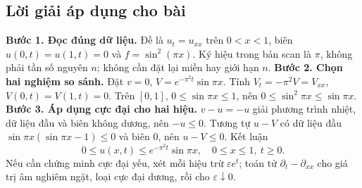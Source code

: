 \documentclass[10pt,a4paper]{article}
\begin{document}
\subsection*{Lời giải áp dụng cho bài}
\textbf{Bước 1. Đọc đúng dữ liệu.} Đề là $u_t=u_{xx}$ trên $0<x<1$, biên $u(0,t)=u(1,t)=0$ và $f=\sin^2(\pi x)$. Ký hiệu trong bản scan là $\pi$, không phải tần số nguyên $n$; không cần đặt lại miền hay giới hạn $n$.
\textbf{Bước 2. Chọn hai nghiệm so sánh.} Đặt $v=0$, $V=e^{-\pi^2t}\sin\pi x$. Tính $V_t=-\pi^2V=V_{xx}$, $V(0,t)=V(1,t)=0$. Trên $[0,1]$, $0\le\sin\pi x\le1$, nên $0\le\sin^2\pi x\le\sin\pi x$.
\textbf{Bước 3. Áp dụng cực đại cho hai hiệu.} $v-u=-u$ giải phương trình nhiệt, dữ liệu đầu và biên không dương, nên $-u\le0$. Tương tự $u-V$ có dữ liệu đầu $\sin\pi x(\sin\pi x-1)\le0$ và biên $0$, nên $u-V\le0$. Kết luận
\[0\le u(x,t)\le e^{-\pi^2t}\sin\pi x,\quad 0\le x\le1,\ t\ge0.\]
Nếu cần chứng minh cực đại yếu, xét mỗi hiệu trừ $\varepsilon e^t$; toán tử $\partial_t-\partial_{xx}$ cho giá trị âm nghiêm ngặt, loại cực đại dương, rồi cho $\varepsilon\downarrow0$.
\end{document}
